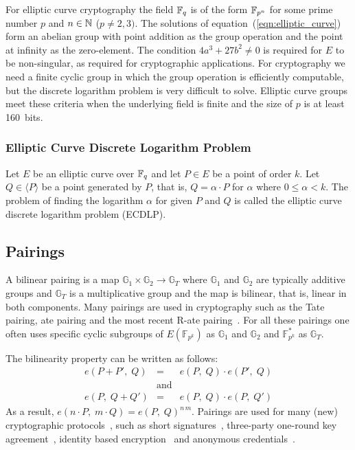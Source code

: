 For elliptic curve cryptography the field $\mathbb{F}_{q}$ is of the form $\mathbb{F}_{p^n}$ for
some prime number $p$ and $n \in \mathbb{N}$ ($p \neq 2,3)$. The solutions of
equation~(\ref{eqn:elliptic_curve}) form an abelian group with point addition
as the group operation and the point at infinity as the zero-element. The
condition $4a^3 + 27b^2 \neq 0$ is required for $E$ to be non-singular, as
required for cryptographic applications. For cryptography we need a finite
cyclic group in which the group operation is efficiently computable, but the
discrete logarithm problem is very difficult to solve. Elliptic curve groups
meet these criteria when the underlying field is finite and the size of $p$ is
at least 160~bits.

\subsubsection{Elliptic Curve Discrete Logarithm Problem}

Let $E$ be an elliptic curve over $\mathbb{F}_{q}$ and let $P \in E$ be a point of order
$k$. Let $Q \in \langle P \rangle$ be a point generated by $P$, that is,
$Q = \alpha \cdot P$ for $\alpha$ where $0 \leq \alpha < k$. The problem of
finding the logarithm $\alpha$ for given $P$ and $Q$ is called the elliptic
curve discrete logarithm problem (ECDLP).


\subsection{Pairings}\label{sec:pairings}

A bilinear pairing is a map $\mathbb{G}_1 \times \mathbb{G}_2 \rightarrow
\mathbb{G}_T$ where $\mathbb{G}_1$ and $\mathbb{G}_2$ are typically additive
groups and $\mathbb G_T$ is a multiplicative group and the map is bilinear, that
is, linear in both components. Many pairings are used in cryptography such as the
Tate pairing, ate pairing and the most recent R-ate
pairing~\cite{Vercauteren09}. For all these pairings one often uses specific cyclic
subgroups of $E(\mathbb{F}_{p^k})$ as $\mathbb{G}_1$ and $\mathbb{G}_2$
and $\mathbb{F}_{p^k}^*$ as $\mathbb{G}_T$.

The bilinearity property can be written as follows:
\begin{equation*}
  \begin{array}{rcl}
    e(P + P',\; Q) & = & e(P,\; Q)\cdot e(P',\; Q) \\
     & \text{and} & \\
    e(P,\; Q + Q') & = & e(P,\; Q)\cdot e(P,\; Q')
  \end{array}
\end{equation*}
As a result, $e(n\cdot P,\; m\cdot Q) = e(P,\; Q)^{n\,m}$. Pairings are used for many
(new) cryptographic protocols~\cite{BSS05}, such as short
signatures~\cite{BonehLS04}, three-party one-round key agreement~\cite{Joux04},
identity based encryption~\cite{BonehFranklin01} and anonymous
credentials~\cite{CamenischLysyanskaya04}.

